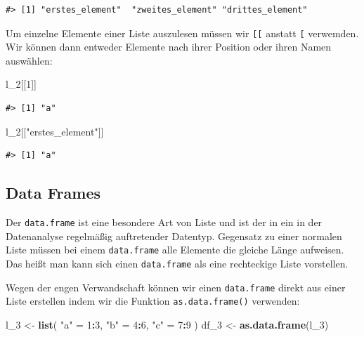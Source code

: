 \documentclass[]{book}
\newenvironment{Shaded}{\begin{snugshade}}{\end{snugshade}}
\newcommand{\KeywordTok}[1]{\textcolor[rgb]{0.13,0.29,0.53}{\textbf{#1}}}
\newcommand{\DecValTok}[1]{\textcolor[rgb]{0.00,0.00,0.81}{#1}}
\newcommand{\StringTok}[1]{\textcolor[rgb]{0.31,0.60,0.02}{#1}}
\newcommand{\OperatorTok}[1]{\textcolor[rgb]{0.81,0.36,0.00}{\textbf{#1}}}
\newcommand{\NormalTok}[1]{#1}
\begin{document}
\begin{verbatim}
#> [1] "erstes_element"  "zweites_element" "drittes_element"
\end{verbatim}

Um einzelne Elemente einer Liste auszulesen müssen wir \texttt{{[}{[}}
anstatt \texttt{{[}} verwemden. Wir können dann entweder Elemente nach
ihrer Position oder ihren Namen auswählen:

\begin{Shaded}
\begin{Highlighting}[]
\NormalTok{l_}\DecValTok{2}\NormalTok{[[}\DecValTok{1}\NormalTok{]]}
\end{Highlighting}
\end{Shaded}

\begin{verbatim}
#> [1] "a"
\end{verbatim}

\begin{Shaded}
\begin{Highlighting}[]
\NormalTok{l_}\DecValTok{2}\NormalTok{[[}\StringTok{"erstes_element"}\NormalTok{]]}
\end{Highlighting}
\end{Shaded}

\begin{verbatim}
#> [1] "a"
\end{verbatim}

\subsection{Data Frames}\label{data-frames}

Der \texttt{data.frame} ist eine besondere Art von Liste und ist der in
ein in der Datenanalyse regelmäßig auftretender Datentyp. Gegensatz zu
einer normalen Liste müssen bei einem \texttt{data.frame} alle Elemente
die gleiche Länge aufweisen. Das heißt man kann sich einen
\texttt{data.frame} als eine rechteckige Liste vorstellen.

Wegen der engen Verwandschaft können wir einen \texttt{data.frame}
direkt aus einer Liste erstellen indem wir die Funktion
\texttt{as.data.frame()} verwenden:

\begin{Shaded}
\begin{Highlighting}[]
\NormalTok{l_}\DecValTok{3}\NormalTok{ <-}\StringTok{ }\KeywordTok{list}\NormalTok{(}
  \StringTok{"a"}\NormalTok{ =}\StringTok{ }\DecValTok{1}\OperatorTok{:}\DecValTok{3}\NormalTok{,}
  \StringTok{"b"}\NormalTok{ =}\StringTok{ }\DecValTok{4}\OperatorTok{:}\DecValTok{6}\NormalTok{,}
  \StringTok{"c"}\NormalTok{ =}\StringTok{ }\DecValTok{7}\OperatorTok{:}\DecValTok{9}
\NormalTok{)}
\NormalTok{df_}\DecValTok{3}\NormalTok{ <-}\StringTok{ }\KeywordTok{as.data.frame}\NormalTok{(l_}\DecValTok{3}\NormalTok{)}
\end{Highlighting}
\end{Shaded}
\end{document}
